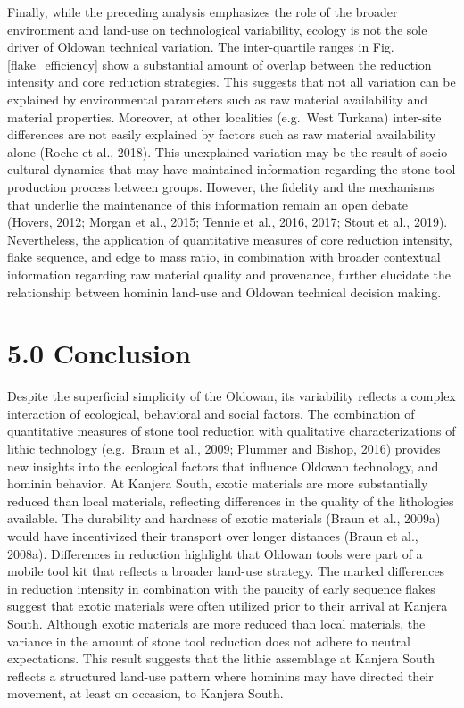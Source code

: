 \documentclass[]{elsarticle} %
\begin{document}
Finally, while the preceding analysis emphasizes the role of the broader
environment and land-use on technological variability, ecology is not
the sole driver of Oldowan technical variation. The inter-quartile
ranges in Fig. \ref{flake_efficiency} show a substantial amount of
overlap between the reduction intensity and core reduction strategies.
This suggests that not all variation can be explained by environmental
parameters such as raw material availability and material properties.
Moreover, at other localities (e.g.~West Turkana) inter-site differences
are not easily explained by factors such as raw material availability
alone (Roche et al., 2018). This unexplained variation may be the result
of socio-cultural dynamics that may have maintained information
regarding the stone tool production process between groups. However, the
fidelity and the mechanisms that underlie the maintenance of this
information remain an open debate (Hovers, 2012; Morgan et al., 2015;
Tennie et al., 2016, 2017; Stout et al., 2019). Nevertheless, the
application of quantitative measures of core reduction intensity, flake
sequence, and edge to mass ratio, in combination with broader contextual
information regarding raw material quality and provenance, further
elucidate the relationship between hominin land-use and Oldowan
technical decision making.

\hypertarget{conclusion}{%
\section{5.0 Conclusion}\label{conclusion}}

Despite the superficial simplicity of the Oldowan, its variability
reflects a complex interaction of ecological, behavioral and social
factors. The combination of quantitative measures of stone tool
reduction with qualitative characterizations of lithic technology
(e.g.~Braun et al., 2009; Plummer and Bishop, 2016) provides new
insights into the ecological factors that influence Oldowan technology,
and hominin behavior. At Kanjera South, exotic materials are more
substantially reduced than local materials, reflecting differences in
the quality of the lithologies available. The durability and hardness of
exotic materials (Braun et al., 2009a) would have incentivized their
transport over longer distances (Braun et al., 2008a). Differences in
reduction highlight that Oldowan tools were part of a mobile tool kit
that reflects a broader land-use strategy. The marked differences in
reduction intensity in combination with the paucity of early sequence
flakes suggest that exotic materials were often utilized prior to their
arrival at Kanjera South. Although exotic materials are more reduced
than local materials, the variance in the amount of stone tool reduction
does not adhere to neutral expectations. This result suggests that the
lithic assemblage at Kanjera South reflects a structured land-use
pattern where hominins may have directed their movement, at least on
occasion, to Kanjera South.
\end{document}

